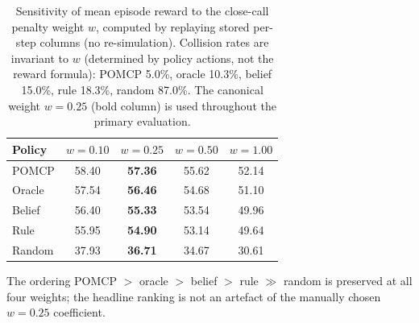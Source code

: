 \begin{table}[htbp]
\centering
\caption{Sensitivity of mean episode reward to the close-call penalty weight $w$,
  computed by replaying stored per-step columns (no re-simulation).
  Collision rates are invariant to $w$ (determined by policy actions, not the reward
  formula): POMCP 5.0\%, oracle 10.3\%, belief 15.0\%, rule 18.3\%, random 87.0\%.
  The canonical weight $w{=}0.25$ (bold column) is used throughout the primary
  evaluation.}
\label{tab:penalty_ablation}
\small
\begin{tabular}{lcccc}
\toprule
\textbf{Policy}
  & \textbf{$w{=}0.10$}
  & \textbf{$w{=}0.25$}
  & \textbf{$w{=}0.50$}
  & \textbf{$w{=}1.00$} \\
\midrule
POMCP  & 58.40 & \textbf{57.36} & 55.62 & 52.14 \\
Oracle & 57.54 & \textbf{56.46} & 54.68 & 51.10 \\
Belief & 56.40 & \textbf{55.33} & 53.54 & 49.96 \\
Rule   & 55.95 & \textbf{54.90} & 53.14 & 49.64 \\
Random & 37.93 & \textbf{36.71} & 34.67 & 30.61 \\
\bottomrule
\end{tabular}
\begin{tablenotes}
\small
\item The ordering POMCP $>$ oracle $>$ belief $>$ rule $\gg$ random is preserved
  at all four weights; the headline ranking is not an artefact of the manually
  chosen $w{=}0.25$ coefficient.
\end{tablenotes}
\end{table}
